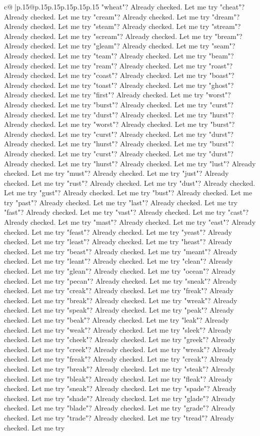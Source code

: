 \documentclass{article}
\begin{document}
{\begin{supertabular}{c@{$\;$}|p{.15\linewidth}@{}p{.15\linewidth}p{.15\linewidth}p{.15\linewidth}p{.15\linewidth}p{.15\linewidth}}
{{{"wheat"? Already checked. Let me try "cheat"? Already checked. Let me try "cream"? Already checked. Let me try "dream"? Already checked. Let me try "steam"? Already checked. Let me try "stream"? Already checked. Let me try "scream"? Already checked. Let me try "bream"? Already checked. Let me try "gleam"? Already checked. Let me try "seam"? Already checked. Let me try "team"? Already checked. Let me try "beam"? Already checked. Let me try "ream"? Already checked. Let me try "roast"? Already checked. Let me try "coast"? Already checked. Let me try "boast"? Already checked. Let me try "toast"? Already checked. Let me try "ghost"? Already checked. Let me try "first"? Already checked. Let me try "worst"? Already checked. Let me try "burst"? Already checked. Let me try "curst"? Already checked. Let me try "durst"? Already checked. Let me try "hurst"? Already checked. Let me try "worst"? Already checked. Let me try "burst"? Already checked. Let me try "curst"? Already checked. Let me try "durst"? Already checked. Let me try "hurst"? Already checked. Let me try "burst"? Already checked. Let me try "curst"? Already checked. Let me try "durst"? Already checked. Let me try "hurst"? Already checked. Let me try "lust"? Already checked. Let me try "must"? Already checked. Let me try "just"? Already checked. Let me try "rust"? Already checked. Let me try "dust"? Already checked. Let me try "gust"? Already checked. Let me try "bust"? Already checked. Let me try "past"? Already checked. Let me try "last"? Already checked. Let me try "fast"? Already checked. Let me try "vast"? Already checked. Let me try "cast"? Already checked. Let me try "mast"? Already checked. Let me try "east"? Already checked. Let me try "feast"? Already checked. Let me try "yeast"? Already checked. Let me try "least"? Already checked. Let me try "heast"? Already checked. Let me try "beast"? Already checked. Let me try "meant"? Already checked. Let me try "leant"? Already checked. Let me try "clean"? Already checked. Let me try "glean"? Already checked. Let me try "ocean"? Already checked. Let me try "pecan"? Already checked. Let me try "sneak"? Already checked. Let me try "creak"? Already checked. Let me try "freak"? Already checked. Let me try "break"? Already checked. Let me try "wreak"? Already checked. Let me try "speak"? Already checked. Let me try "peak"? Already checked. Let me try "beak"? Already checked. Let me try "leak"? Already checked. Let me try "weak"? Already checked. Let me try "sleek"? Already checked. Let me try "cheek"? Already checked. Let me try "greek"? Already checked. Let me try "creek"? Already checked. Let me try "wreak"? Already checked. Let me try "freak"? Already checked. Let me try "creak"? Already checked. Let me try "break"? Already checked. Let me try "steak"? Already checked. Let me try "bleak"? Already checked. Let me try "fleak"? Already checked. Let me try "sneak"? Already checked. Let me try "spade"? Already checked. Let me try "shade"? Already checked. Let me try "glade"? Already checked. Let me try "blade"? Already checked. Let me try "grade"? Already checked. Let me try "trade"? Already checked. Let me try "tread"? Already checked. Let me try }}}
\end{supertabular}}
\end{document}
